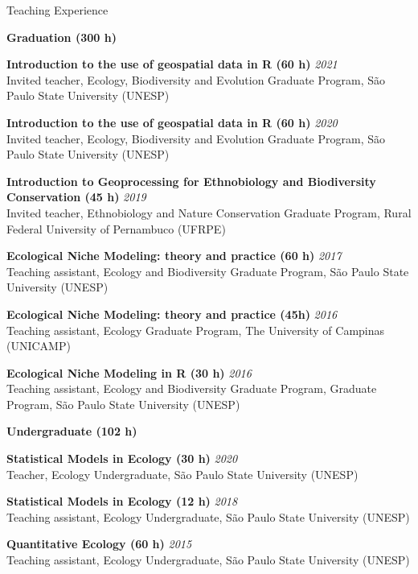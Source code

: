 \documentclass{resume}
\begin{document}

\begin{rSection}{Teaching Experience}

{\bf Graduation (300 h)}

{\bf Introduction to the use of geospatial data in R (60 h)} \hfill{\em 2021} \\ 
Invited teacher, Ecology, Biodiversity and Evolution Graduate Program, São Paulo State University (UNESP)

{\bf Introduction to the use of geospatial data in R (60 h)} \hfill{\em 2020} \\ 
Invited teacher, Ecology, Biodiversity and Evolution Graduate Program, São Paulo State University (UNESP)

{\bf Introduction to Geoprocessing for Ethnobiology and Biodiversity Conservation (45 h)} \hfill{\em 2019} \\ 
Invited teacher, Ethnobiology and Nature Conservation Graduate Program, Rural Federal University of Pernambuco (UFRPE)

{\bf Ecological Niche Modeling: theory and practice (60 h)} \hfill{\em 2017} \\ 
Teaching assistant, Ecology and Biodiversity Graduate Program, São Paulo State University (UNESP)

{\bf Ecological Niche Modeling: theory and practice (45h)} \hfill{\em 2016} \\ 
Teaching assistant, Ecology Graduate Program, The University of Campinas (UNICAMP)

{\bf Ecological Niche Modeling in R (30 h)} \hfill{\em 2016} \\ 
Teaching assistant, Ecology and Biodiversity Graduate Program, Graduate Program, São Paulo State University (UNESP)

{\bf Undergraduate (102 h)}

{\bf Statistical Models in Ecology (30 h)} \hfill{\em 2020} \\ 
Teacher, Ecology Undergraduate, São Paulo State University (UNESP)

{\bf Statistical Models in Ecology (12 h)} \hfill{\em 2018} \\ 
Teaching assistant, Ecology Undergraduate, São Paulo State University (UNESP)

{\bf Quantitative Ecology (60 h)} \hfill{\em 2015} \\ 
Teaching assistant, Ecology Undergraduate, São Paulo State University (UNESP)

\end{rSection}
\end{document}
